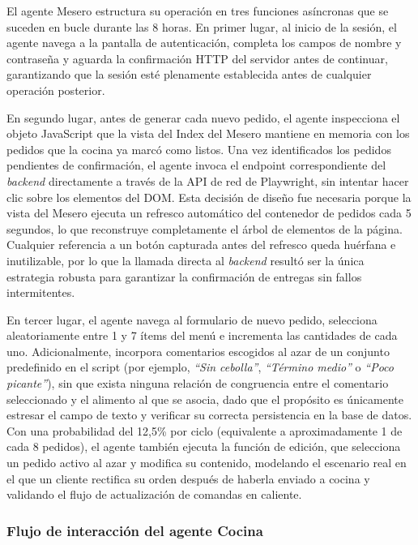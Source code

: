 El agente Mesero estructura su operación en tres funciones asíncronas que se suceden en bucle durante las 8 horas. En primer lugar, al inicio de la sesión, el agente navega a la pantalla de autenticación, completa los campos de nombre y contraseña y aguarda la confirmación HTTP del servidor antes de continuar, garantizando que la sesión esté plenamente establecida antes de cualquier operación posterior.

En segundo lugar, antes de generar cada nuevo pedido, el agente inspecciona el objeto JavaScript que la vista del Index del Mesero mantiene en memoria con los pedidos que la cocina ya marcó como listos. Una vez identificados los pedidos pendientes de confirmación, el agente invoca el endpoint correspondiente del \textit{backend} directamente a través de la API de red de Playwright, sin intentar hacer clic sobre los elementos del DOM. Esta decisión de diseño fue necesaria porque la vista del Mesero ejecuta un refresco automático del contenedor de pedidos cada 5 segundos, lo que reconstruye completamente el árbol de elementos de la página. Cualquier referencia a un botón capturada antes del refresco queda huérfana e inutilizable, por lo que la llamada directa al \textit{backend} resultó ser la única estrategia robusta para garantizar la confirmación de entregas sin fallos intermitentes.

En tercer lugar, el agente navega al formulario de nuevo pedido, selecciona aleatoriamente entre 1 y 7 ítems del menú e incrementa las cantidades de cada uno. Adicionalmente, incorpora comentarios escogidos al azar de un conjunto predefinido en el script (por ejemplo, \textit{``Sin cebolla''}, \textit{``Término medio''} o \textit{``Poco picante''}), sin que exista ninguna relación de congruencia entre el comentario seleccionado y el alimento al que se asocia, dado que el propósito es únicamente estresar el campo de texto y verificar su correcta persistencia en la base de datos. Con una probabilidad del 12,5\% por ciclo (equivalente a aproximadamente 1 de cada 8 pedidos),
el agente también ejecuta la función de edición, que selecciona un pedido activo al azar y modifica su contenido, modelando el escenario real en el que un cliente rectifica su orden después de haberla enviado a cocina y validando el flujo de actualización de comandas en caliente.

\subsubsection*{Flujo de interacción del agente Cocina}

